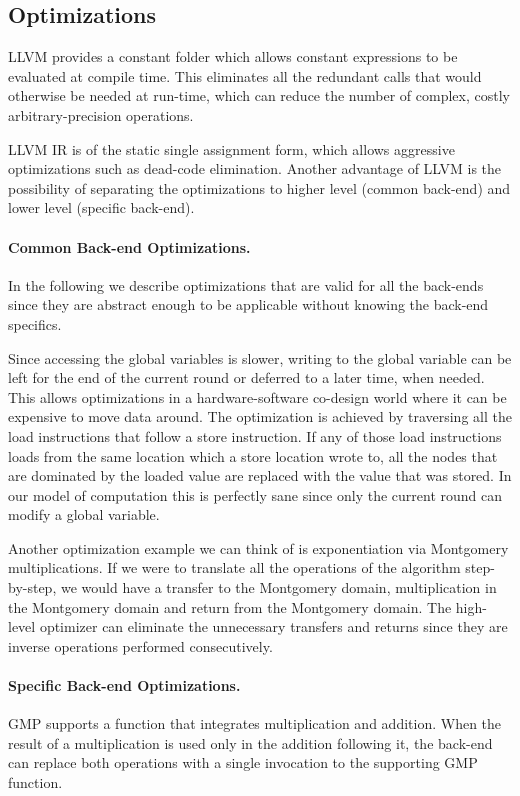 
\subsection{Optimizations}

LLVM provides a constant folder which allows constant expressions to
be evaluated at compile time. This eliminates all the redundant calls
that would otherwise be needed at run-time, which can reduce the number
of complex, costly arbitrary-precision operations.

LLVM IR is of the static single assignment form, which allows
aggressive optimizations such as dead-code elimination. Another
advantage of LLVM is the possibility of separating the optimizations
to higher level (common back-end) and lower level (specific back-end).

\paragraph{Common Back-end Optimizations.}
In the following we describe optimizations that are valid for all the
back-ends since they are abstract enough to be applicable without
knowing the back-end specifics.

Since accessing the global variables is slower, writing to the global
variable can be left for the end of the current round or deferred to a
later time, when needed. This allows optimizations in a
hardware-software co-design world where it can be expensive to move
data around.  The optimization is achieved by traversing all the load
instructions that follow a store instruction.  If any of those load
instructions loads from the same location which a store location wrote
to, all the nodes that are dominated by the loaded value are replaced
with the value that was stored. In our model of computation this is
perfectly sane since only the current round can modify a global
variable.

Another optimization example we can think of is exponentiation via
Montgomery multiplications. If we were to translate all the operations
of the algorithm step-by-step, we would have a transfer to the
Montgomery domain, multiplication in the Montgomery domain and return
from the Montgomery domain. The high-level optimizer can eliminate the
unnecessary transfers and returns since they are inverse operations
performed consecutively.

\paragraph{Specific Back-end Optimizations.}
GMP supports a function that integrates multiplication and addition.
When the result of a multiplication is used only in the addition
following it, the back-end can replace both operations with a single
invocation to the supporting GMP function.

